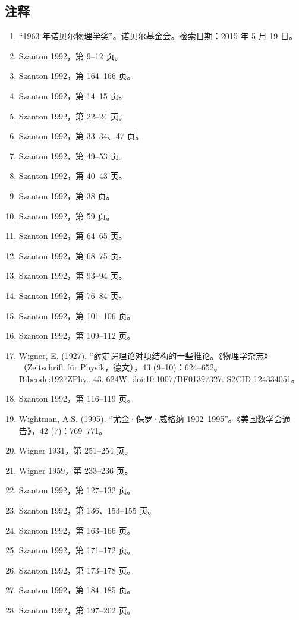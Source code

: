 \subsection{注释}
\begin{enumerate}
\item “1963 年诺贝尔物理学奖”。诺贝尔基金会。检索日期：2015 年 5 月 19 日。
\item Szanton 1992，第 9–12 页。
\item Szanton 1992，第 164–166 页。
\item Szanton 1992，第 14–15 页。
\item Szanton 1992，第 22–24 页。
\item Szanton 1992，第 33–34、47 页。
\item Szanton 1992，第 49–53 页。
\item Szanton 1992，第 40–43 页。
\item Szanton 1992，第 38 页。
\item Szanton 1992，第 59 页。
\item Szanton 1992，第 64–65 页。
\item Szanton 1992，第 68–75 页。
\item Szanton 1992，第 93–94 页。
\item Szanton 1992，第 76–84 页。
\item Szanton 1992，第 101–106 页。
\item Szanton 1992，第 109–112 页。
\item Wigner, E. (1927). “薛定谔理论对项结构的一些推论。《物理学杂志》（Zeitschrift für Physik，德文），43 (9–10)：624–652。Bibcode:1927ZPhy...43..624W. doi:10.1007/BF01397327. S2CID 124334051。
\item Szanton 1992，第 116–119 页。
\item Wightman, A.S. (1995). “尤金·保罗·威格纳 1902–1995”。《美国数学会通告》，42 (7)：769–771。
\item Wigner 1931，第 251–254 页。
\item Wigner 1959，第 233–236 页。
\item Szanton 1992，第 127–132 页。
\item Szanton 1992，第 136、153–155 页。
\item Szanton 1992，第 163–166 页。
\item Szanton 1992，第 171–172 页。
\item Szanton 1992，第 173–178 页。
\item Szanton 1992，第 184–185 页。
\item Szanton 1992，第 197–202 页。

\end{enumerate}
